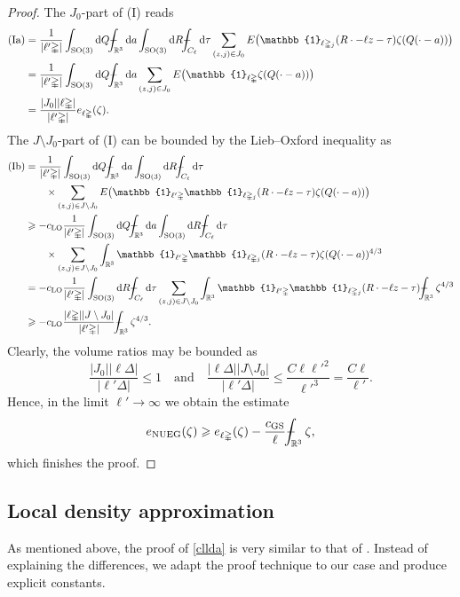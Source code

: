 \documentclass[final,onefignum,onetabnum,reqno]{amsart}
\theoremstyle{remark}
\renewcommand{\le}{\leqslant}
\renewcommand{\ge}{\geqslant}
\newcommand{\RR}{\mathbb{R}}
\newcommand{\SO}{\mathrm{SO}}
\newcommand{\LO}{\mathrm{LO}} %
\newcommand{\NUEG}{\mathrm{NUEG}} %
\newcommand{\GS}{\mathrm{GS}} %
\newcommand{\iden}{\mathbb{1}} %
\newcommand{\tetra}{\mathbb{\Delta}} %
\newcommand{\dd}{\mathrm{d}} %
\def\Xint#1{\mathchoice
{\XXint\displaystyle\textstyle{#1}}%
{\XXint\textstyle\scriptstyle{#1}}%
{\XXint\scriptstyle\scriptscriptstyle{#1}}%
{\XXint\scriptscriptstyle\scriptscriptstyle{#1}}%
\!\int}
\def\XXint#1#2#3{{\setbox0=\hbox{$#1{#2#3}{\int}$ }
\vcenter{\hbox{$#2#3$ }}\kern-.6\wd0}}
\def\dashint{\Xint-}
\begin{document}
\begin{proof}
The $J_0$-part of (I) reads
\begin{align*}
\mathrm{(Ia)}&=\frac{1}{|\ell'\tetra|} \int_{\SO(3)}\dd Q\dashint_{\RR^3}\dd a \int_{\SO(3)}\dd R \dashint_{C_\ell}\dd\tau \sum_{(z,j)\in J_0}
E\bigl(\iden_{\ell\tetra_j}(R\cdot-\ell z-\tau)\zeta(Q(\cdot-a))\bigr)\\
&=\frac{1}{|\ell'\tetra|} \int_{\SO(3)}\dd Q\dashint_{\RR^3}\dd a \sum_{(z,j)\in J_0}
E\bigl(\iden_{\ell\tetra}\zeta(Q(\cdot-a))\bigr)\\
&=\frac{|J_0||\ell\tetra|}{|\ell'\tetra|} e_{\ell\tetra}(\zeta).
\end{align*}
The $J\setminus J_0$-part of (I) can be bounded by the Lieb--Oxford inequality as
\begin{align*}
\mathrm{(Ib)}&=\frac{1}{|\ell'\tetra|} \int_{\SO(3)}\dd Q\dashint_{\RR^3}\dd a \int_{\SO(3)}\dd R \dashint_{C_\ell}\dd\tau\\
&\quad\quad \times \sum_{(z,j)\in J\setminus J_0}
E\bigl(\iden_{\ell'\tetra}\iden_{\ell\tetra_j}(R\cdot-\ell z-\tau)\zeta(Q(\cdot-a))\bigr)\\
&\ge - c_\LO \frac{1}{|\ell'\tetra|} \int_{\SO(3)}\dd Q\dashint_{\RR^3}\dd a \int_{\SO(3)}\dd R \dashint_{C_\ell}\dd\tau \\
&\quad\quad\times\sum_{(z,j)\in J\setminus J_0}\int_{\RR^3} \iden_{\ell'\tetra}\iden_{\ell\tetra_j}(R\cdot-\ell z-\tau)\zeta(Q(\cdot-a))^{4/3}\\
&=- c_\LO \frac{1}{|\ell'\tetra|} \int_{\SO(3)}\dd R \dashint_{C_\ell}\dd\tau \sum_{(z,j)\in J\setminus J_0}\int_{\RR^3} \iden_{\ell'\tetra}\iden_{\ell\tetra_j}(R\cdot-\ell z-\tau) \dashint_{\RR^3} \zeta^{4/3}\\
&\ge - c_\LO \frac{|\ell\tetra||J\setminus J_0|}{|\ell'\tetra|}\dashint_{\RR^3} \zeta^{4/3}.
\end{align*}
Clearly, the volume ratios may be bounded as
$$
\frac{|J_0||\ell\tetra|}{|\ell'\tetra|}\le 1 \quad\text{and}\quad \frac{|\ell\tetra||J\setminus J_0|}{|\ell'\tetra|}\le\frac{C\ell\ell'^2}{\ell'^3}=\frac{C\ell}{\ell'}.
$$
Hence, in the limit $\ell'\to\infty$ we obtain the estimate
$$
e_\NUEG(\zeta)\ge e_{\ell\tetra}(\zeta) - \frac{c_\GS}{\ell} \dashint_{\RR^3}\zeta,
$$
which finishes the proof. 
\end{proof}

\subsection{Local density approximation}\label{clldaproof}
As mentioned above, the proof of \cref{cllda} is very similar to that of \cite[Theorem 4]{lewin2020local}. Instead of explaining the differences, we adapt the proof technique to our case and
produce explicit constants.
\end{document}
